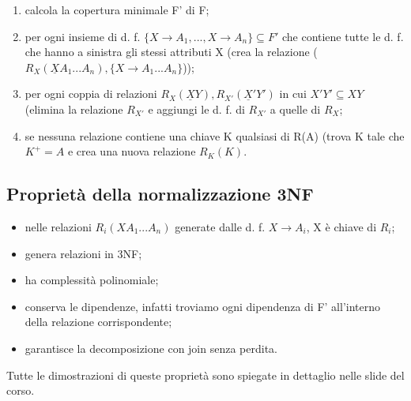 \begin{enumerate}
    \item calcola la copertura minimale F' di F;
\item per ogni insieme di d. f. $\{X \rightarrow A_1, ..., X \rightarrow A_n\} \subseteq F'$ che contiene tutte le d. f. che hanno a sinistra gli stessi attributi X (crea la relazione ($R_X(\underline{X}A_1 ... A_n), \{X \rightarrow A_1 ... A_n\}$));
\item per ogni coppia di relazioni $R_X(\underline{X}Y), R_{X'}(\underline{X}'Y')$ in cui $X'Y' \subseteq XY$ (elimina la relazione $R_{X'}$ e aggiungi le d. f. di $R_{X'}$ a quelle di $R_X$;
\item se nessuna relazione contiene una chiave K qualsiasi di R(A) (trova K tale che $K^+ = A$ e crea una nuova relazione $R_K(K)$.
\end{enumerate}

\subsection{Proprietà della normalizzazione 3NF}

\begin{itemize}
    \item nelle relazioni $R_i(XA_1 ... A_n)$ generate dalle d. f. $X \rightarrow A_i$, X è chiave di $R_i$;
    \item genera relazioni in 3NF;
    \item ha complessità polinomiale;
    \item conserva le dipendenze, infatti troviamo ogni dipendenza di F' all’interno della relazione corrispondente;
    \item garantisce la decomposizione con join senza perdita.
\end{itemize}

Tutte le dimostrazioni di queste proprietà sono spiegate in dettaglio nelle slide del corso.